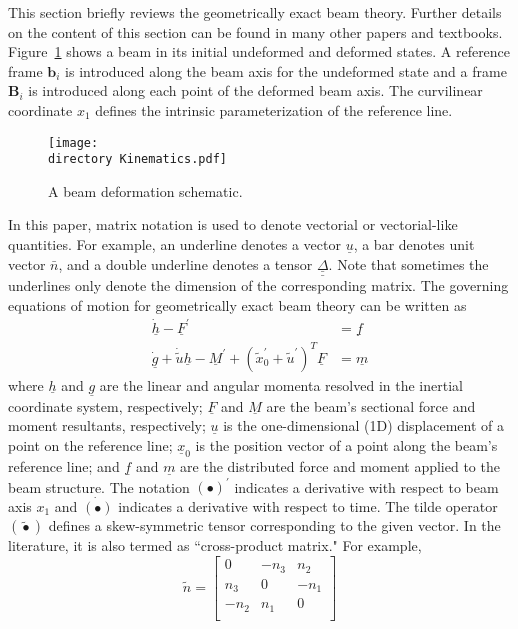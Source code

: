 \documentclass{aiaa-tc}
\def\directory{EPSF/}
\renewcommand{\vec}[1]{\underline{#1}}
\renewcommand{\skew}[1]{\widetilde{#1}}
\begin{document}
This section briefly reviews the geometrically exact beam theory. Further details on the content of this section can be found in many other papers\cite{YuGEBT} and textbooks. \cite{HodgesBeamBook,Bauchau:2010}
Figure~\ref{Kinematics} shows a beam in its initial undeformed
and deformed states. A reference frame $\mathbf{b}_i$ is introduced along the
beam axis for the undeformed state and a frame $\mathbf{B}_i$ is introduced
along each point of the deformed beam axis. The curvilinear coordinate $x_1$ defines the intrinsic parameterization of the reference line.
\begin{figure}
\centering
\texttt{[image: \\directory Kinematics.pdf]}
\caption{A beam deformation schematic.} \label{Kinematics}
\end{figure}
In this paper, matrix notation is used to denote vectorial or vectorial-like quantities. For example, an underline denotes a vector $\underline{u}$, a bar denotes unit vector $\bar{n}$, and a double underline denotes a tensor $\underline{\underline{\Delta}}$. Note that sometimes the underlines only denote the dimension of the corresponding matrix. The governing equations of motion for geometrically exact beam theory can be written as \cite{Bauchau:2010}
\begin{align}
	\label{GovernGEBT-1}
	\dot{\underline{h}} - \underline{F}^\prime &= \underline{f} \\
	\label{GovernGEBT-2}
	\dot{\underline{g}} + \dot{\tilde{u}} \underline{h} - \underline{M}^\prime + (\tilde{x}_0^\prime + \tilde{u}^\prime)^T \underline{F} &= \underline{m}
\end{align}
where $\vec{h}$ and $\vec{g}$ are the linear and angular momenta resolved in the inertial coordinate system, respectively; $\vec{F}$ and $\vec{M}$ are the beam's sectional force and moment resultants, respectively; $\vec{u}$ is the one-dimensional (1D) displacement of a point on the reference line; $\vec{x}_0$ is the position vector of a point along the beam's reference line;  and $\vec{f}$ and $\vec{m}$ are the distributed force and moment applied to the beam structure.  The notation $(\bullet)^\prime$ indicates a derivative with respect to beam axis $x_1$ and $\dot{(\bullet)}$ indicates a derivative with respect to time. The tilde operator $(\skew{\bullet})$ defines a skew-symmetric tensor corresponding to the given vector. In the literature, it is also termed as ``cross-product matrix." For example,
\[
	\skew{n} = 
	     		\begin{bmatrix}
			0 & -n_3 & n_2 \\
			n_3 & 0 & -n_1 \\
			-n_2 & n_1 & 0\\
			\end{bmatrix}	
\]
\end{document}
